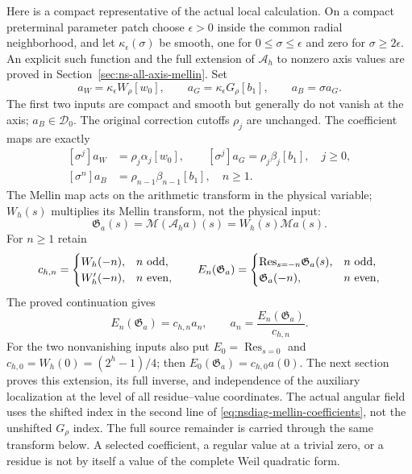 Here is a compact representative of the actual local calculation. On a
compact preterminal parameter patch choose $\epsilon>0$ inside the
common radial neighborhood, and let $\kappa_\epsilon(\sigma)$ be smooth,
one for $0\leq\sigma\leq\epsilon$ and zero for $\sigma\geq2\epsilon$.
An explicit such function and the full extension of $\mathcal A_h$ to
nonzero axis values are proved in Section~\ref{sec:ns-all-axis-mellin}.
Set
\[
 a_W=\kappa_\epsilon W_\rho[w_0],\qquad
 a_G=\kappa_\epsilon G_\rho[b_1],\qquad
 a_B=\sigma a_G.
\]
The first two inputs are compact and smooth but generally do not vanish
at the axis; $a_B\in\mathcal D_0$. The original correction cutoffs
$\rho_j$ are unchanged. The coefficient maps are exactly
\begin{equation}\label{eq:nsdiag-mellin-coefficients}
 \begin{split}
 [\sigma^j]a_W&=\rho_j\alpha_j[w_0],\qquad
 [\sigma^j]a_G=\rho_j\beta_j[b_1],\quad j\geq0,\\
 [\sigma^n]a_B&=\rho_{n-1}\beta_{n-1}[b_1],\quad n\geq1.
 \end{split}
\end{equation}
The Mellin map acts on the arithmetic transform in the physical variable;
$W_h(s)$ multiplies its Mellin transform, not the physical input:
\[
 \mathfrak G_a(s)=\mathcal M(\mathcal A_h a)(s)
                =W_h(s)\mathcal M a(s).
\]
For $n\geq1$ retain
\[
 c_{h,n}=
 \begin{cases}
 W_h(-n),&n\ {\rm odd},\\
 W_h'(-n),&n\ {\rm even},
 \end{cases}
 \qquad
 E_n(\mathfrak G_a)=
 \begin{cases}
 {\rm Res}_{s=-n}\mathfrak G_a(s),&n\ {\rm odd},\\
 \mathfrak G_a(-n),&n\ {\rm even},
 \end{cases}
 \]
The proved continuation gives
\begin{equation}\label{eq:nsdiag-mellin-inverse}
 E_n(\mathfrak G_a)=c_{h,n}a_n,\qquad
 a_n=\frac{E_n(\mathfrak G_a)}{c_{h,n}}.
\end{equation}
For the two nonvanishing inputs also put
$E_0=\operatorname{Res}_{s=0}$ and $c_{h,0}=W_h(0)=(2^h-1)/4$;
then $E_0(\mathfrak G_a)=c_{h,0}a(0)$. The next section proves this
extension, its full inverse, and independence of the auxiliary localization
at the level of all residue--value coordinates. The actual angular field
uses the shifted index in the second line of
\eqref{eq:nsdiag-mellin-coefficients}, not the unshifted $G_\rho$ index.
The full source remainder is carried through the same transform below.
A selected coefficient, a regular value at a trivial zero, or a residue
is not by itself a value of the complete Weil quadratic form.

